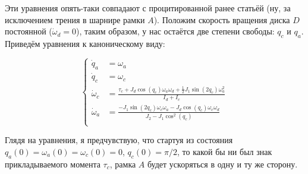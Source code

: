 \documentclass{article}
\begin{document}
Эти уравнения опять-таки совпадают с процитированной ранее статьёй (ну, за исключением трения в шарнире рамки $A$).
Положим скорость вращения диска $D$ постоянной ($\dot\omega_d=0$), таким образом, у нас остаётся две степени свободы: $q_c$ и $q_a$.
Приведём уравнения к каноническому виду:

$$
\left\{\begin{array}{rl}
\dot q_a &= \omega_a \\
\dot q_c &= \omega_c \\
\dot\omega_c &= \frac{\tau_c + J_d \cos(q_c) \omega_a \omega_d + \frac{1}{2}J_1  \sin(2 q_c) \omega_a^2}{I_d+I_c} \\
\dot\omega_a &= \frac{- J_1 \sin(2 q_c)\omega_c\omega_a - J_d \cos(q_c) \omega_c\omega_d}{J_2 - J_1 \cos^2(q_c)} \\
\end{array}\right.
$$

Глядя на уравнения, я предчувствую, что стартуя из состояния $q_a(0)=\omega_a(0)=\omega_c(0)=0$, $q_c(0)=\pi/2$, то какой бы ни был знак прикладываемого момента $\tau_c$,
рамка $A$ будет ускоряться в одну и ту же сторону.
\end{document}
